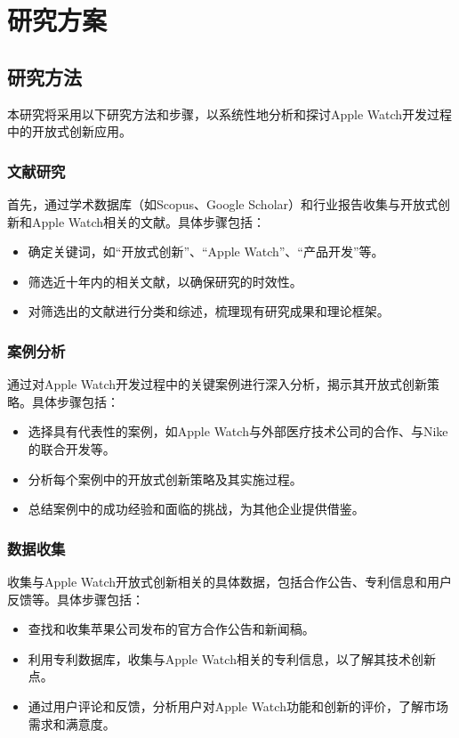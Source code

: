 
\chapter{研究方案}

\section{研究方法}

本研究将采用以下研究方法和步骤，以系统性地分析和探讨Apple Watch开发过程中的开放式创新应用。

\subsection{文献研究}

首先，通过学术数据库（如Scopus、Google Scholar）和行业报告收集与开放式创新和Apple Watch相关的文献。具体步骤包括：
\begin{itemize}
    \item 确定关键词，如“开放式创新”、“Apple Watch”、“产品开发”等。
    \item 筛选近十年内的相关文献，以确保研究的时效性。
    \item 对筛选出的文献进行分类和综述，梳理现有研究成果和理论框架。
\end{itemize}

\subsection{案例分析}

通过对Apple Watch开发过程中的关键案例进行深入分析，揭示其开放式创新策略。具体步骤包括：
\begin{itemize}
    \item 选择具有代表性的案例，如Apple Watch与外部医疗技术公司的合作、与Nike的联合开发等\citep{apple2024,davidson_assessing_2023}。
    \item 分析每个案例中的开放式创新策略及其实施过程。
    \item 总结案例中的成功经验和面临的挑战，为其他企业提供借鉴\citep{chesbrough_beyond_2006, gehani2016corporate}。
\end{itemize}

\subsection{数据收集}

收集与Apple Watch开放式创新相关的具体数据，包括合作公告、专利信息和用户反馈等。具体步骤包括：
\begin{itemize}
    \item 查找和收集苹果公司发布的官方合作公告和新闻稿\citep{apple2024}。
    \item 利用专利数据库，收集与Apple Watch相关的专利信息，以了解其技术创新点\citep{dahlander_how_2010}。
    \item 通过用户评论和反馈，分析用户对Apple Watch功能和创新的评价，了解市场需求和满意度\citep{davidson_assessing_2023}。
\end{itemize}

